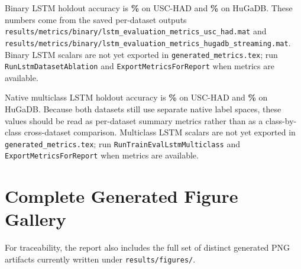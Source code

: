 \ifnum{}
Binary LSTM holdout accuracy is \textbf{\LstmBinaryHoldoutAccUsc\%} on USC-HAD and \textbf{\LstmBinaryHoldoutAccHuGa\%} on HuGaDB. These numbers come from the saved per-dataset outputs \texttt{results/metrics/binary/lstm\_evaluation\_metrics\_usc\_had.mat} and \texttt{results/metrics/binary/lstm\_evaluation\_metrics\_hugadb\_streaming.mat}.
\else
Binary LSTM scalars are not yet exported in \texttt{generated\_metrics.tex}; run \texttt{RunLstmDatasetAblation} and \texttt{ExportMetricsForReport} when metrics are available.
\fi

\ifnum{}
Native multiclass LSTM holdout accuracy is \textbf{\LstmMulticlassHoldoutAccUsc\%} on USC-HAD and \textbf{\LstmMulticlassHoldoutAccHuGa\%} on HuGaDB. Because both datasets still use separate native label spaces, these values should be read as per-dataset summary metrics rather than as a class-by-class cross-dataset comparison.
\else
Multiclass LSTM scalars are not yet exported in \texttt{generated\_metrics.tex}; run \texttt{RunTrainEvalLstmMulticlass} and \texttt{ExportMetricsForReport} when metrics are available.
\fi


\clearpage
\section{Complete Generated Figure Gallery}
For traceability, the report also includes the full set of distinct generated PNG artifacts currently written under \texttt{results/figures/}.


